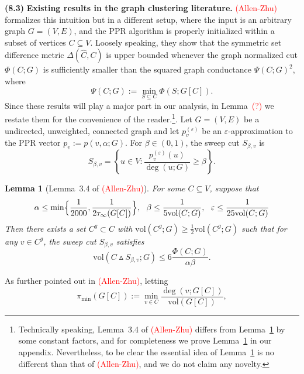 \documentclass{article}
\newcommand{\set}[1]{\left\{#1\right\}}
\newcommand{\vol}{\mathrm{vol}}
\newcommand{\1}{\mathbf{1}}
\newcommand{\wh}[1]{\widehat{#1}}
\theoremstyle{alden}
\theoremstyle{aldenthm}
\newtheorem{lemma}{Lemma}
\theoremstyle{definition}
\theoremstyle{remark}
\begin{document}
\textbf{(8.3)} \textbf{Existing results in the graph clustering literature.} \textcolor{red}{(Allen-Zhu)} formalizes this intuition but in a different setup, where the input is an arbitrary graph $G = (V,E)$, and the PPR algorithm is properly initialized within a subset of vertices $C \subseteq V$. Loosely speaking, they show that the symmetric set difference metric $\Delta(\wh{C},C)$ is upper bounded whenever the graph normalized cut $\Phi(C;G)$ is sufficiently smaller than the squared graph conductance $\Psi(C;G)^2$, where
\begin{equation*}
\Psi(C;G) := \min_{S \subseteq C} \Phi(S;G[C]).
\end{equation*}
Since these results will play a major part in our analysis, in Lemma~\textcolor{red}{(?)} we restate them for the convenience of the reader.\footnote{Technically speaking, Lemma~3.4 of \textcolor{red}{(Allen-Zhu)} differs from Lemma~\ref{lem:zhu} by some constant factors, and for completeness we prove Lemma~\ref{lem:zhu} in our appendix. Nevertheless, to be clear the essential idea of Lemma~\ref{lem:zhu} is no different than that of \textcolor{red}{(Allen-Zhu)}, and we do not claim any novelty.}. Let $G = (V,E)$ be a undirected, unweighted, connected graph and let $p_v^{(\varepsilon)}$ be an $\varepsilon$-approximation to the PPR vector $p_v := p(v,\alpha;G)$. For $\beta \in (0,1)$,  the sweep cut $S_{\beta,v}$ is
\begin{equation*}
S_{\beta,v} = \set{u \in V: \frac{p_v^{(\varepsilon)}(u)}{\deg(u;G)} \geq \beta}.
\end{equation*} 
\begin{lemma}[Lemma~3.4 of \textcolor{red}{(Allen-Zhu)}]
	\label{lem:zhu}
	For some $C \subseteq V$, suppose that 
	\begin{equation}
	\label{eqn:zhu_condition}
	\alpha \leq \min\Bigl\{\frac{1}{2000}, \frac{1}{2\tau_{\infty}(G[C])}\Bigr\},~~ \beta \leq \frac{1}{5\vol(C;G)},~~ \varepsilon \leq \frac{1}{25\vol(C;G)}
	\end{equation}
	Then there exists a set $C^g \subset C$ with $\vol(C^g;G) \geq \frac{1}{2}\vol(C^g;G)$ such that for any $v \in C^g$, the sweep cut $S_{\beta,v}$ satisfies
	\begin{equation}
	\label{eqn:zhu_ub}
	\vol(C \vartriangle S_{\beta,v};G) \leq 6\frac{\Phi(C;G)}{\alpha \beta}.
	\end{equation}
\end{lemma}
As further pointed out in \textcolor{red}{(Allen-Zhu)}, letting
\begin{equation*}
\pi_{\min}(G[C]) := \min_{v \in C} \frac{\deg(v;G[C])}{\vol(G[C])},
\end{equation*}
\end{document}
